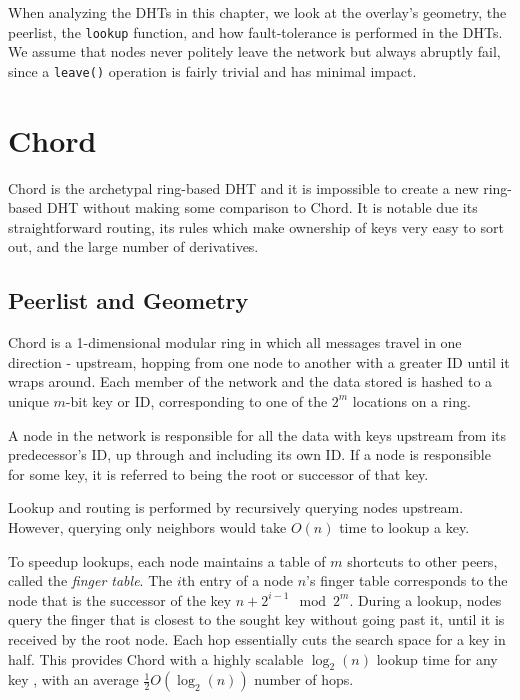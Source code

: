 \documentclass[10pt,letterpaper,twoside]{report}
\begin{document}
When analyzing the DHTs in this chapter, we look at the overlay's geometry, the peerlist, the \texttt{lookup} function, and how fault-tolerance is performed in the DHTs.
We assume that nodes never politely leave the network but always abruptly fail, since a \texttt{leave()} operation is fairly trivial and has minimal impact.


\section{Chord}

Chord \cite{chord} is the archetypal ring-based DHT and it is impossible to create a new ring-based DHT without making some comparison to Chord.
It is notable due its straightforward routing, its rules which make ownership of keys very easy to sort out, and the large number of derivatives.


\subsection*{Peerlist and Geometry}
Chord is a 1-dimensional modular ring in which all messages travel in one direction - upstream, hopping from one node to another with a greater ID until it wraps around.
Each member of the network and the data stored is hashed to a unique $m$-bit key or ID, corresponding to one of the $2^m$ locations on a ring. 

A node in the network is responsible for all the data with keys upstream from its predecessor's ID, up through and including its own ID.  
If a node is responsible for some key, it is referred to being the root or successor of that key.

Lookup and routing is performed by recursively querying nodes upstream.
However, querying only neighbors would take $O(n)$ time to lookup a key.


To speedup lookups, each node maintains a table of $m$ shortcuts to other peers, called the \textit{finger table}.
The $i$th entry of a node $n$'s finger table corresponds to the node that is the successor of the key $n+2^{i-1} \mod 2^m $.  
During a lookup,  nodes query the finger that is closest to the sought key without going past it, until it is received by the root node.
Each hop essentially cuts the search space for a key in half.
This provides Chord with a highly scalable $\log_2(n)$ lookup time for any key \cite{chord}, with an average $\frac{1}{2}O(\log_{2}(n))$ number of hops.
\end{document}

